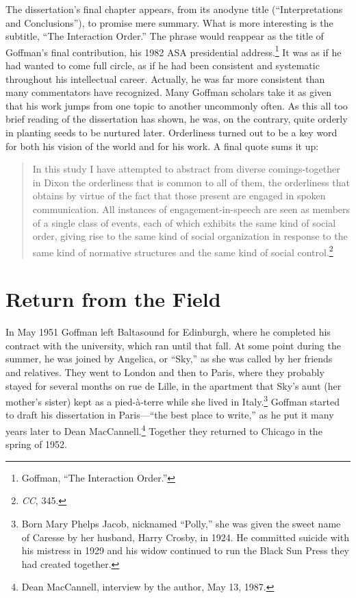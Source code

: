 \documentclass[twoside,symmetric,nobib,justified]{tufte-book}
\begin{document}
The dissertation's final chapter appears, from its anodyne title
(``Interpretations and Conclusions''), to promise mere summary. What is
more interesting is the subtitle, ``The Interaction Order.'' The phrase
would reappear as the title of Goffman's final contribution, his 1982
ASA presidential address.\footnote{Goffman, ``The Interaction Order.''}
It was as if he had wanted to come full circle, as if he had been
consistent and systematic throughout his intellectual career. Actually,
he was far more consistent than many commentators have recognized. Many
Goffman scholars take it as given that his work jumps from one topic to
another uncommonly often. As this all too brief reading of the
dissertation has shown, he was, on the contrary, quite orderly in
planting seeds to be nurtured later. Orderliness turned out to be a key
word for both his vision of the world and for his work. A final quote
sums it up:

\begin{quote}
In this study I have attempted to abstract from diverse comings-together
in Dixon the orderliness that is common to all of them, the orderliness
that obtains by virtue of the fact that those present are engaged in
spoken communication. All instances of engagement-in-speech are seen as
members of a single class of events, each of which exhibits the same
kind of social order, giving rise to the same kind of social
organization in response to the same kind of normative structures and
the same kind of social control.\footnote{\emph{CC}, 345.}
\end{quote}

\hypertarget{return-from-the-field}{%
\section{Return from the Field}\label{return-from-the-field}}

In May 1951 Goffman left Baltasound for Edinburgh, where he completed
his contract with the university, which ran until that fall. At some
point during the summer, he was joined by Angelica, or ``Sky,'' as she
was called by her friends and relatives. They went to London and then to
Paris, where they probably stayed for several months on rue de Lille, in
the apartment that Sky's aunt (her mother's sister) kept as a
pied-à-terre while she lived in Italy.\footnote{Born Mary Phelps Jacob,
  nicknamed ``Polly,'' she was given the sweet name of Caresse by her
  husband, Harry Crosby, in 1924. He committed suicide with his mistress
  in 1929 and his widow continued to run the Black Sun Press they had
  created together.} Goffman started to draft his dissertation in
Paris---``the best place to write,'' as he put it many years later to
Dean MacCannell.\footnote{Dean MacCannell, interview by the author, May
  13, 1987.} Together they returned to Chicago in the spring of 1952.
\end{document}
